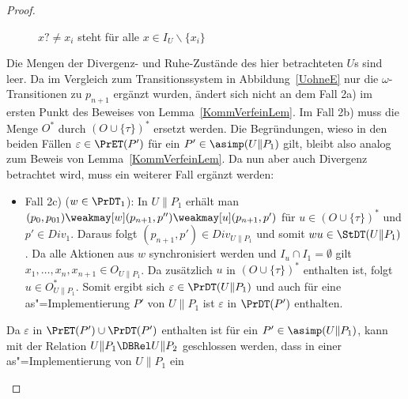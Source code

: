 \begin{proof}
\begin{itemize}
\begin{figure} [h!tbp]
\begin{center}
        \caption{$x?\neq x_i$ steht für alle $x\in I_U\backslash\{x_i\}$}
      \label{UohneEmitO}
      \end{center}
      \end{figure}
      Die Mengen der Divergenz- und Ruhe-Zustände des hier betrachteten $U$s
      sind leer. Da im Vergleich zum Transitionssystem in Abbildung~\ref{UohneE}
      nur die $\omega$-Transitionen zu $p_{n+1}$ ergänzt wurden, ändert sich
      nicht an dem Fall 2a) im ersten Punkt des Beweises von
      Lemma~\ref{KommVerfeinLem}. Im Fall 2b) muss die Menge $O^*$ durch
      $(O\cup\{\tau\})^*$ ersetzt werden. Die Begründungen, wieso in den beiden
      Fällen $\varepsilon\in\PrET (P')$ für ein $P'\in\asimp (U\|P_1)$ gilt,
      bleibt also analog zum Beweis von Lemma~\ref{KommVerfeinLem}. Da nun aber
      auch Divergenz betrachtet wird, muss ein weiterer Fall ergänzt werden:
      \begin{itemize}
        \item Fall 2c) ($w\in\PrDT _1$): In $U\|P_1$ erhält man $(p_0,p_{01})
          \weakmay[w] (p_{n+1},p'')\weakmay[u] (p_{n+1},p')$ für $u\in (O\cup
          \{\tau\})^*$ und $p'\in Div_1$. Daraus folgt $(p_{n+1},p')\in
          Div_{U\|P_1}$ und somit $wu\in\StDT (U\|P_1)$. Da alle Aktionen aus
          $w$ synchronisiert werden und $I_u\cap I_1=\emptyset$ gilt $x_1,\dots
          , x_n, x_{n+1}\in O_{U\|P_1}$. Da zusätzlich $u$ in $(O\cup \{\tau\})
          ^*$ enthalten ist, folgt $u\in O^*_{U\|P_1}$. Somit ergibt sich
          $\varepsilon\in\PrDT (U\|P_1)$ und auch für eine as"=Implementierung
          $P'$ von $U\|P_1$ ist $\varepsilon$ in $\PrDT (P')$ enthalten.
      \end{itemize}
      Da $\varepsilon$ in $\PrET (P') \cup \PrDT (P')$ enthalten ist für ein
      $P'\in\asimp (U\|P_1)$, kann mit der Relation $U\|P_1\DBRel U\|P_2$
      geschlossen werden, dass in einer as"=Implementierung von $U\|P_1$ ein

\end{itemize}
\end{proof}
